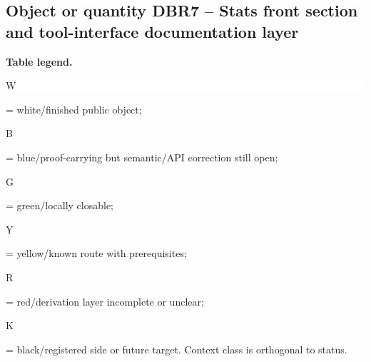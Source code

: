 \subsection*{Object or quantity DBR7 -- Stats front section and tool-interface documentation layer}
\hypertarget{objproof:DBR7}{}
\par\smallskip\noindent\begin{minipage}{0.99\linewidth}\footnotesize\raggedright\textbf{Table legend.} \colorbox{white}{\strut W} = white/finished public object; \colorbox{cyan!20}{\strut B} = blue/proof-carrying but semantic/API correction still open; \colorbox{green!18}{\strut G} = green/locally closable; \colorbox{yellow!25}{\strut Y} = yellow/known route with prerequisites; \colorbox{red!20}{\strut R} = red/derivation layer incomplete or unclear; \colorbox{black!18}{\strut K} = black/registered side or future target. Context class is orthogonal to status.\end{minipage}\par\vspace{0.25em}
